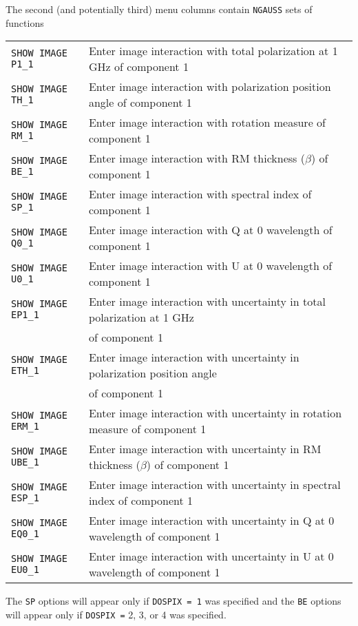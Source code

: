 \documentclass[twoside]{article}
\begin{document}
The second (and potentially third) menu columns contain {\tt NGAUSS}
sets of functions
\vfill\eject

\begin{center}
\begin{tabular}{|l|l|}\hline
 {\tt SHOW IMAGE P1\_1} & Enter image interaction with total
                     polarization at 1 GHz of component 1\\
 {\tt SHOW IMAGE TH\_1} & Enter image interaction with polarization
                     position angle of component 1\\
 {\tt SHOW IMAGE RM\_1} & Enter image interaction with rotation
                     measure of component 1\\
 {\tt SHOW IMAGE BE\_1} & Enter image interaction with RM thickness
                     ($\beta$) of component 1\\
 {\tt SHOW IMAGE SP\_1} & Enter image interaction with spectral index
                     of component 1\\
 {\tt SHOW IMAGE Q0\_1} & Enter image interaction with Q at 0
                     wavelength of component 1\\
 {\tt SHOW IMAGE U0\_1} & Enter image interaction with U at 0
                     wavelength of component 1\\
 {\tt SHOW IMAGE EP1\_1} & Enter image interaction with uncertainty in
                     total polarization at 1 GHz\\
                         & of component 1\\
 {\tt SHOW IMAGE ETH\_1} & Enter image interaction with uncertainty in
                     polarization position angle\\
                         & of component 1\\
 {\tt SHOW IMAGE ERM\_1} & Enter image interaction with uncertainty in
                     rotation measure of component 1\\
 {\tt SHOW IMAGE UBE\_1} & Enter image interaction with uncertainty in
                     RM thickness ($\beta$) of component 1\\
 {\tt SHOW IMAGE ESP\_1} & Enter image interaction with uncertainty in
                     spectral index of component 1\\
 {\tt SHOW IMAGE EQ0\_1} & Enter image interaction with uncertainty in
                     Q at 0 wavelength of component 1\\
 {\tt SHOW IMAGE EU0\_1} & Enter image interaction with uncertainty in
                     U at 0 wavelength of component 1\\ \hline
\end{tabular}
\end{center}
The {\tt SP} options will appear only if {\tt DOSPIX = 1} was specified
and the {\tt BE} options will appear only if {\tt DOSPIX =} 2, 3, or 4
was specified.
\end{document}
